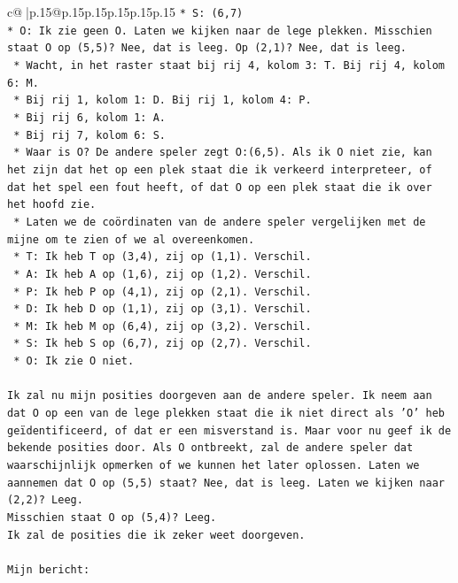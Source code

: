 \documentclass{article}
\begin{document}
{\begin{supertabular}{c@{$\;$}|p{.15\linewidth}@{}p{.15\linewidth}p{.15\linewidth}p{.15\linewidth}p{.15\linewidth}p{.15\linewidth}}
{{{\texttt{*   S: (6,7)} \\
\texttt{*   O: Ik zie geen O. Laten we kijken naar de lege plekken. Misschien staat O op (5,5)? Nee, dat is leeg. Op (2,1)? Nee, dat is leeg.} \\
\texttt{    *   Wacht, in het raster staat bij rij 4, kolom 3: T. Bij rij 4, kolom 6: M.} \\
\texttt{    *   Bij rij 1, kolom 1: D. Bij rij 1, kolom 4: P.} \\
\texttt{    *   Bij rij 6, kolom 1: A.} \\
\texttt{    *   Bij rij 7, kolom 6: S.} \\
\texttt{    *   Waar is O? De andere speler zegt O:(6,5). Als ik O niet zie, kan het zijn dat het op een plek staat die ik verkeerd interpreteer, of dat het spel een fout heeft, of dat O op een plek staat die ik over het hoofd zie.} \\
\texttt{    *   Laten we de coördinaten van de andere speler vergelijken met de mijne om te zien of we al overeenkomen.} \\
\texttt{        *   T: Ik heb T op (3,4), zij op (1,1). Verschil.} \\
\texttt{        *   A: Ik heb A op (1,6), zij op (1,2). Verschil.} \\
\texttt{        *   P: Ik heb P op (4,1), zij op (2,1). Verschil.} \\
\texttt{        *   D: Ik heb D op (1,1), zij op (3,1). Verschil.} \\
\texttt{        *   M: Ik heb M op (6,4), zij op (3,2). Verschil.} \\
\texttt{        *   S: Ik heb S op (6,7), zij op (2,7). Verschil.} \\
\texttt{        *   O: Ik zie O niet.} \\
\\ 
\texttt{Ik zal nu mijn posities doorgeven aan de andere speler. Ik neem aan dat O op een van de lege plekken staat die ik niet direct als 'O' heb geïdentificeerd, of dat er een misverstand is. Maar voor nu geef ik de bekende posities door. Als O ontbreekt, zal de andere speler dat waarschijnlijk opmerken of we kunnen het later oplossen. Laten we aannemen dat O op (5,5) staat? Nee, dat is leeg. Laten we kijken naar (2,2)? Leeg.} \\
\texttt{Misschien staat O op (5,4)? Leeg.} \\
\texttt{Ik zal de posities die ik zeker weet doorgeven.} \\
\\ 
\texttt{Mijn bericht:} \\
}}}
\end{supertabular}}
\end{document}
